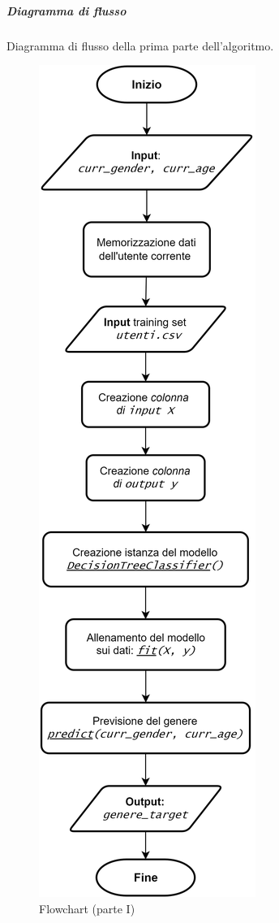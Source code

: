 \newpage
\subparagraph{Diagramma di flusso} 
Diagramma di flusso della prima parte dell'algoritmo.
\begin{figure} [H]
    \centering
    \includegraphics[scale=0.7]{images/flowchart-Parte I.png}
    \caption{Flowchart (parte I)}
    \label{fig-fc1}
\end{figure}


